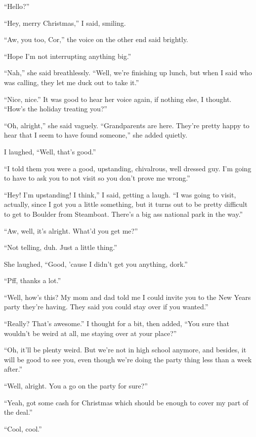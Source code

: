 ``Hello?''

``Hey, merry Christmas,'' I said, smiling.

``Aw, you too, Cor,'' the voice on the other end said brightly.

``Hope I'm not interrupting anything big.''

``Nah,'' she said breathlessly.  ``Well, we're finishing up lunch, but when I said who was calling, they let me duck out to take it.''

``Nice, nice.''  It was good to hear her voice again, if nothing else, I thought.  ``How's the holiday treating you?''

``Oh, alright,'' she said vaguely.  ``Grandparents are here.  They're pretty happy to hear that I seem to have found someone,'' she added quietly.

I laughed, ``Well, that's good.''

``I told them you were a good, upstanding, chivalrous, well dressed guy.  I'm going to have to ask you to not visit so you don't prove me wrong.''

``Hey!  I'm upstanding!  I think,'' I said, getting a laugh.  ``I was going to visit, actually, since I got you a little something, but it turns out to be pretty difficult to get to Boulder from Steamboat.  There's a big ass national park in the way.''

``Aw, well, it's alright.  What'd you get me?''

``Not telling, duh.  Just a little thing.''

She laughed,  ``Good, 'cause I didn't get you anything, dork.''

``Pff, thanks a lot.''

``Well, how's this?  My mom and dad told me I could invite you to the New Years party they're having.  They said you could stay over if you wanted.''

``Really?  That's awesome.''  I thought for a bit, then added, ``You sure that wouldn't be weird at all, me staying over at your place?''

``Oh, it'll be plenty weird.  But we're not in high school anymore, and besides, it will be good to see you, even though we're doing the party thing less than a week after.''

``Well, alright.  You a go on the party for sure?''

``Yeah, got some cash for Christmas which should be enough to cover my part of the deal.''

``Cool, cool.''

